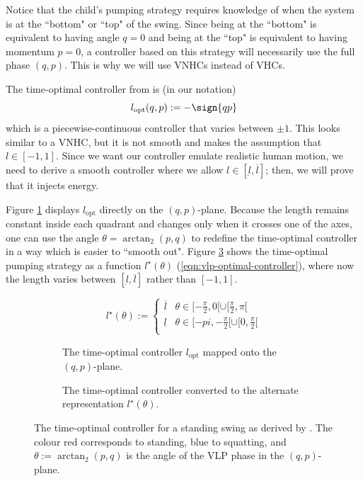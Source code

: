 Notice that the child's pumping strategy requires knowledge of
when the system is at the ``bottom" or ``top" of the swing. 
Since being at the ``bottom" is equivalent to having angle \(q = 0\) and being
at the ``top" is equivalent to having momentum \(p = 0\), a controller based on
this strategy will necessarily use the full phase \((q,p)\). 
This is why we will use VNHCs instead of VHCs.

The time-optimal controller from \cite{pumping_swing_standing_squatting} is (in
our notation)
\[
   l_\text{opt}(q,p) := -\sign{qp}
\]
which is a piecewise-continuous controller that varies between \(\pm 1\). 
This looks similar to a VNHC, but it is not smooth and makes the assumption that 
\(l \in [-1,1]\). 
Since we want our controller emulate realistic human motion, we need to derive a
smooth controller where we allow \(l \in [\underbar{l},\overbar{l}]\); then, we
will prove that it injects energy.

Figure \ref{fig:vlp-optimal-controller-qp-plane} displays \(l_\text{opt}\) 
directly on the \((q,p)\)-plane.
Because the length remains constant inside each quadrant and changes only when it
crosses one of the axes, one can use the angle \(\theta = \arctan_2(p,q)\) to
redefine the time-optimal controller in a way which is easier to ``smooth out".
Figure \ref{fig:vlp-optimal-controller} shows the time-optimal pumping strategy
as a function \(l^\star(\theta)\) (\ref{eqn:vlp-optimal-controller}), where now
the length varies between \([\underbar{l},\overbar{l}]\) rather than 
\([-1,1]\). 

\begin{equation}\label{eqn:vlp-optimal-controller}
   l^\star(\theta):= \begin{cases}
      \overline{l} & \theta \in [-\frac{\pi}{2},0[ \cup [\frac{\pi}{2}, \pi[ \\
      \underline{l} & \theta \in [-pi, -\frac{\pi}{2}[ \cup [0,\frac{\pi}{2}[ \\
   \end{cases}
\end{equation}

\begin{figure}
   \centering
   \begin{subfigure}[t]{0.45\textwidth}
      
      \caption{The time-optimal controller \(l_\text{opt}\) mapped onto the \((q,p)\)-plane.}
      \label{fig:vlp-optimal-controller-qp-plane}
   \end{subfigure}
   \hfill
   \begin{subfigure}[t]{0.45\textwidth}
      
      \caption{The time-optimal controller converted to the alternate
         representation \(l^\star(\theta)\).}
      \label{fig:vlp-optimal-controller}
   \end{subfigure}
   \caption{The time-optimal controller for a standing swing as derived by
      \cite{pumping_swing_standing_squatting}. The colour red
      corresponds to standing, blue to squatting, and 
      \(\theta := \arctan_2(p,q)\) is the angle of the VLP phase in the
      \((q,p)\)-plane.}
\end{figure}

